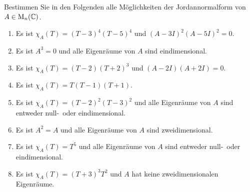 \documentclass[a4paper,10pt]{scrartcl}
\begin{document}
\begin{question}
  Bestimmen Sie in den Folgenden alle Möglichkeiten der Jordannormalform von $A \in \operatorname{M}_n(\mathbb{C})$.
  \begin{enumerate}[leftmargin=*]
    \item
     Es ist $\chi_A(T) = (T-3)^4 (T-5)^4$ und $(A - 3I)^2 (A - 5I)^2 = 0$.
    \item
      Es ist $A^3 = 0$ und alle Eigenräume von $A$ sind eindimensional.
    \item
      Es ist $\chi_A(T) = (T-2)(T+2)^3$ und $(A - 2I)(A + 2I) = 0$.
    \item
      Es ist $\chi_A(T) = T(T-1)(T+1)$.
    \item
      Es ist $\chi_A(T) = (T-2)^2(T-3)^2$ und alle Eigenräume von $A$ sind entweder null-\ oder eindimensional.
    \item
      Es ist $A^2 = A$ und alle Eigenräume von $A$ sind zweidimensional.
    \item
      Es ist $\chi_A(T) = T^5$ und alle Eigenräume von $A$ sind entweder null-\ oder eindimensional.
    \item
      Es ist $\chi_A(T) = (T+3)^3 T^2$ und $A$ hat keine zweidimensionalen Eigenräume.
  \end{enumerate}
\end{question}
\end{document}
